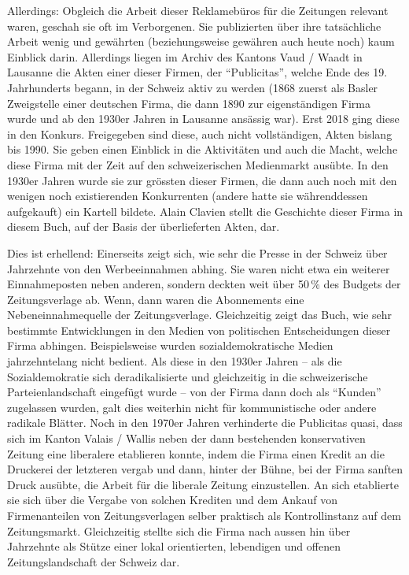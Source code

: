\documentclass[a4paper,
fontsize=11pt,
oneside,
numbers=noperiodatend,
parskip=half-,
bibliography=totoc,
final
]{scrartcl}
\begin{document}
Allerdings: Obgleich die Arbeit dieser Reklamebüros für die Zeitungen
relevant waren, geschah sie oft im Verborgenen. Sie publizierten über
ihre tatsächliche Arbeit wenig und gewährten (beziehungsweise gewähren
auch heute noch) kaum Einblick darin. Allerdings liegen im Archiv des
Kantons Vaud / Waadt in Lausanne die Akten einer dieser Firmen, der
\enquote{Publicitas}, welche Ende des 19. Jahrhunderts begann, in der
Schweiz aktiv zu werden (1868 zuerst als Basler Zweigstelle einer
deutschen Firma, die dann 1890 zur eigenständigen Firma wurde und ab den
1930er Jahren in Lausanne ansässig war). Erst 2018 ging diese in den
Konkurs. Freigegeben sind diese, auch nicht vollständigen, Akten bislang
bis 1990. Sie geben einen Einblick in die Aktivitäten und auch die
Macht, welche diese Firma mit der Zeit auf den schweizerischen
Medienmarkt ausübte. In den 1930er Jahren wurde sie zur grössten dieser
Firmen, die dann auch noch mit den wenigen noch existierenden
Konkurrenten (andere hatte sie währenddessen aufgekauft) ein Kartell
bildete. Alain Clavien stellt die Geschichte dieser Firma in diesem
Buch, auf der Basis der überlieferten Akten, dar.

Dies ist erhellend: Einerseits zeigt sich, wie sehr die Presse in der
Schweiz über Jahrzehnte von den Werbeeinnahmen abhing. Sie waren nicht
etwa ein weiterer Einnahmeposten neben anderen, sondern deckten weit
über 50\,\% des Budgets der Zeitungsverlage ab. Wenn, dann waren die
Abonnements eine Nebeneinnahmequelle der Zeitungsverlage. Gleichzeitig
zeigt das Buch, wie sehr bestimmte Entwicklungen in den Medien von
politischen Entscheidungen dieser Firma abhingen. Beispielsweise wurden
sozialdemokratische Medien jahrzehntelang nicht bedient. Als diese in
den 1930er Jahren -- als die Sozialdemokratie sich deradikalisierte und
gleichzeitig in die schweizerische Parteienlandschaft eingefügt wurde --
von der Firma dann doch als \enquote{Kunden} zugelassen wurden, galt
dies weiterhin nicht für kommunistische oder andere radikale Blätter.
Noch in den 1970er Jahren verhinderte die Publicitas quasi, dass sich im
Kanton Valais / Wallis neben der dann bestehenden konservativen Zeitung
eine liberalere etablieren konnte, indem die Firma einen Kredit an die
Druckerei der letzteren vergab und dann, hinter der Bühne, bei der Firma
sanften Druck ausübte, die Arbeit für die liberale Zeitung einzustellen.
An sich etablierte sie sich über die Vergabe von solchen Krediten und
dem Ankauf von Firmenanteilen von Zeitungsverlagen selber praktisch als
Kontrollinstanz auf dem Zeitungsmarkt. Gleichzeitig stellte sich die
Firma nach aussen hin über Jahrzehnte als Stütze einer lokal
orientierten, lebendigen und offenen Zeitungslandschaft der Schweiz dar.
\end{document}
